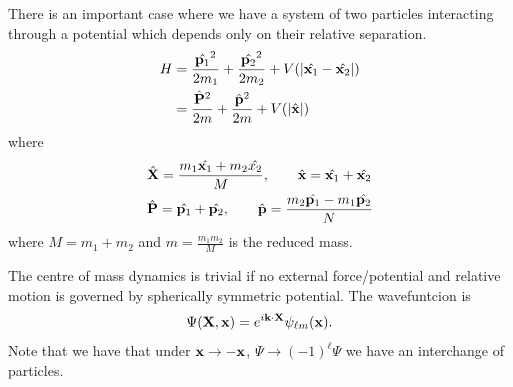 \documentclass{article}
\begin{document}
\begin{example}
  There is an important case where we have a system of two particles interacting through a potential which depends only on their relative separation.
  \begin{align*}
	  H &= \frac{\hat {\mathbf p_1}^2}{2m_1} + \frac{\hat{\mathbf p_2}^2}{2m_2} + V(|\hat{\mathbf x_1} - \hat{\mathbf x_2}|) \\
&= \frac{\hat{\mathbf P}^2}{2m} + \frac{\hat{\mathbf p}^2}{2m} + V(|\hat {\mathbf{x}}|)
  \end{align*}
  where
  \begin{align*}
	  &\hat {\mathbf X} = \frac{m_1 \hat {\mathbf{x}_1} + m_2\hat{x_2}}M,\qquad \hat {\mathbf{x}} = \hat{\mathbf{x}_1} + \hat{\mathbf{x}_2} \\
	  &\hat {\mathbf P} = \hat{\mathbf p_1} + \hat{\mathbf p_2},\qquad \hat{\mathbf p} = \frac{m_2 \hat{\mathbf p_1} - m_1\hat{\mathbf p_2}}N
  \end{align*}
  where $ M = m_1 + m_2 $ and $ m= \frac {m_1m_2}M $ is the reduced mass.\par
  The centre of mass dynamics is trivial if no external force/potential and relative motion is governed by spherically symmetric potential. The wavefuntcion is
  \[
	  \Psi(\mathbf X,\mathbf{x}) = e^{i\mathbf k \cdot\mathbf X} \psi_{\ell m} (\mathbf{x}).
  \]
  Note that we have that under $ \mathbf{x} \to -\mathbf{x} $, $ \Psi \to (-1)^\ell \Psi $ we have an interchange of particles.
\end{example}
\end{document}
